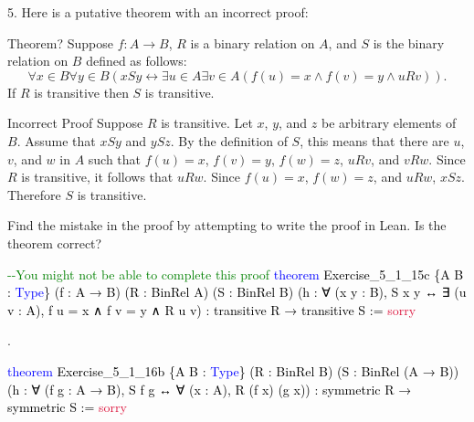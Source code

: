 \documentclass[
  letterpaper,
  DIV=11,
  numbers=noendperiod]{scrreprt}
\newenvironment{Shaded}{\begin{snugshade}}{\end{snugshade}}
\newcommand{\CommentTok}[1]{\textcolor[rgb]{0.37,0.37,0.37}{#1}}
\newcommand{\ConstantTok}[1]{\textcolor[rgb]{0.56,0.35,0.01}{#1}}
\newcommand{\KeywordTok}[1]{\textcolor[rgb]{0.00,0.23,0.31}{#1}}
\newcommand{\NormalTok}[1]{\textcolor[rgb]{0.00,0.23,0.31}{#1}}
\renewcommand{\NormalTok}[1]{\textcolor[HTML]{000000}{#1}}
\renewcommand{\KeywordTok}[1]{\textcolor[HTML]{0000FF}{#1}}
\renewcommand{\CommentTok}[1]{\textcolor[HTML]{008000}{#1}}
\renewcommand{\ConstantTok}[1]{\textcolor[HTML]{DC143C}{#1}}
\newcommand{\nobreakShaded}{\renewenvironment{Shaded}
	{\begin{tcolorbox}[frame hidden, enhanced, interior hidden, boxrule=0pt,
		borderline west={3pt}{0pt}{shadecolor}, sharp corners]}
	{\end{tcolorbox}}}
\newenvironment{numex}[1]
	{\begin{minipage}[t]{0.04\textwidth}\vspace{8pt}{#1}.
		\end{minipage}\nobreakShaded\begin{minipage}[t]{0.96\textwidth}\vspace{0pt}}
	{\end{minipage}}
\newcommand{\excl}[1]{}
\theoremstyle{remark}
\begin{document}
5. Here is a putative theorem with an incorrect proof:

\begin{nthm}{Theorem?}
Suppose \(f : A \to B\), \(R\) is a binary relation on \(A\), and \(S\)
is the binary relation on \(B\) defined as follows: \[
\forall x \in B \forall y \in B(xSy \leftrightarrow \exists u \in A\exists v \in A(f(u) = x \wedge f(v) = y \wedge uRv)).
\] If \(R\) is transitive then \(S\) is transitive.

\end{nthm}

\begin{npf}{Incorrect Proof}
Suppose \(R\) is transitive. Let \(x\), \(y\), and \(z\) be arbitrary
elements of \(B\). Assume that \(xSy\) and \(ySz\). By the definition of
\(S\), this means that there are \(u\), \(v\), and \(w\) in \(A\) such
that \(f(u) = x\), \(f(v) = y\), \(f(w) = z\), \(uRv\), and \(vRw\).
Since \(R\) is transitive, it follows that \(uRw\). Since \(f(u) = x\),
\(f(w) = z\), and \(uRw\), \(xSz\). Therefore \(S\) is transitive.
\excl{~□}\qedhere

\end{npf}

Find the mistake in the proof by attempting to write the proof in Lean.
Is the theorem correct?

\begin{Shaded}
\begin{Highlighting}[]
\CommentTok{{-}{-}You might not be able to complete this proof}
\KeywordTok{theorem}\NormalTok{ Exercise\_5\_1\_15c}
\NormalTok{    \{A B : }\KeywordTok{Type}\NormalTok{\} (f : A → B) (R : BinRel A) (S : BinRel B)}
\NormalTok{    (h : ∀ (x y : B), S x y ↔ ∃ (u v : A), f u = x ∧ f v = y ∧ R u v) :}
\NormalTok{    transitive R → transitive S := }\ConstantTok{sorry}
\end{Highlighting}
\end{Shaded}

\begin{numex}{6}

\begin{Shaded}
\begin{Highlighting}[]
\KeywordTok{theorem}\NormalTok{ Exercise\_5\_1\_16b}
\NormalTok{    \{A B : }\KeywordTok{Type}\NormalTok{\} (R : BinRel B) (S : BinRel (A → B))}
\NormalTok{    (h : ∀ (f g : A → B), S f g ↔ ∀ (x : A), R (f x) (g x)) :}
\NormalTok{    symmetric R → symmetric S := }\ConstantTok{sorry}
\end{Highlighting}
\end{Shaded}

\end{numex}
\end{document}
